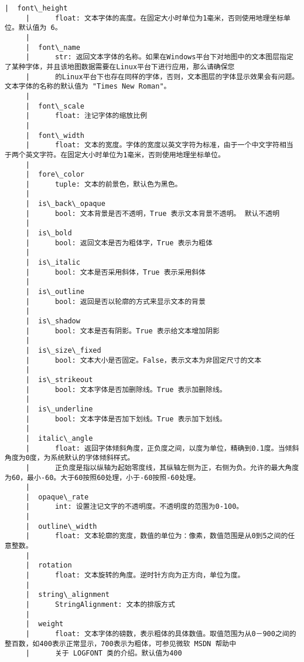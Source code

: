 \documentclass[11pt]{article}
\begin{document}
\begin{Verbatim}[commandchars=\\\{\}]
     |  font\_height
     |      float: 文本字体的高度。在固定大小时单位为1毫米，否则使用地理坐标单位。默认值为 6。
     |  
     |  font\_name
     |      str: 返回文本字体的名称。如果在Windows平台下对地图中的文本图层指定了某种字体，并且该地图数据需要在Linux平台下进行应用，那么请确保您
     |      的Linux平台下也存在同样的字体，否则，文本图层的字体显示效果会有问题。文本字体的名称的默认值为 "Times New Roman"。
     |  
     |  font\_scale
     |      float: 注记字体的缩放比例
     |  
     |  font\_width
     |      float: 文本的宽度。字体的宽度以英文字符为标准，由于一个中文字符相当于两个英文字符。在固定大小时单位为1毫米，否则使用地理坐标单位。
     |  
     |  fore\_color
     |      tuple: 文本的前景色，默认色为黑色。
     |  
     |  is\_back\_opaque
     |      bool: 文本背景是否不透明，True 表示文本背景不透明。 默认不透明
     |  
     |  is\_bold
     |      bool: 返回文本是否为粗体字，True 表示为粗体
     |  
     |  is\_italic
     |      bool: 文本是否采用斜体，True 表示采用斜体
     |  
     |  is\_outline
     |      bool: 返回是否以轮廓的方式来显示文本的背景
     |  
     |  is\_shadow
     |      bool: 文本是否有阴影。True 表示给文本增加阴影
     |  
     |  is\_size\_fixed
     |      bool: 文本大小是否固定。False，表示文本为非固定尺寸的文本
     |  
     |  is\_strikeout
     |      bool: 文本字体是否加删除线。True 表示加删除线。
     |  
     |  is\_underline
     |      bool: 文本字体是否加下划线。True 表示加下划线。
     |  
     |  italic\_angle
     |      float: 返回字体倾斜角度，正负度之间，以度为单位，精确到0.1度。当倾斜角度为0度，为系统默认的字体倾斜样式。
     |      正负度是指以纵轴为起始零度线，其纵轴左侧为正，右侧为负。允许的最大角度为60，最小-60。大于60按照60处理，小于-60按照-60处理。
     |  
     |  opaque\_rate
     |      int: 设置注记文字的不透明度。不透明度的范围为0-100。
     |  
     |  outline\_width
     |      float: 文本轮廓的宽度，数值的单位为：像素，数值范围是从0到5之间的任意整数。
     |  
     |  rotation
     |      float: 文本旋转的角度。逆时针方向为正方向，单位为度。
     |  
     |  string\_alignment
     |      StringAlignment: 文本的排版方式
     |  
     |  weight
     |      float: 文本字体的磅数，表示粗体的具体数值。取值范围为从0－900之间的整百数，如400表示正常显示，700表示为粗体，可参见微软 MSDN 帮助中
     |      关于 LOGFONT 类的介绍。默认值为400
    

\end{Verbatim}
\end{document}
